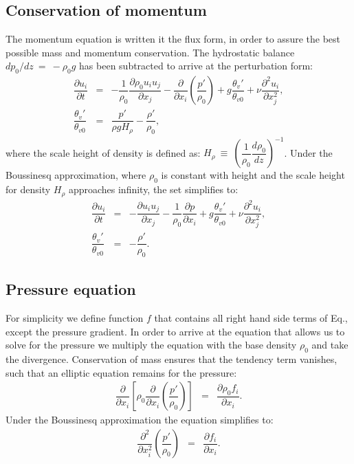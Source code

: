 \documentclass[gmd]{copernicus}
\begin{document}
\subsection{Conservation of momentum}
The momentum equation is written it the flux form, in order to assure the best possible mass and momentum conservation. The hydrostatic balance $dp_0 / dz~=~-\rho_0 g$ has been subtracted to arrive at the perturbation form:
\begin{eqnarray}
\dfrac{\partial u_i}{\partial t} & = & - \dfrac{1}{\rho_0} \dfrac{\partial \rho_0 u_i u_j}{\partial x_j} 
- \dfrac{\partial}{\partial x_i}\left(\dfrac{p'}{\rho_0}\right) + g \dfrac{\theta_v'}{\theta_{v0}} + \nu \dfrac{\partial^2 u_i}{\partial x_j^2}\label{eq:consmoma},\\
\dfrac{\theta_v'}{\theta_{v0}} & = & \dfrac{p'}{\rho g H_{\rho}} - \dfrac{\rho'}{\rho_0}\label{eq:statea},
\end{eqnarray}
where the scale height of density is defined as: $H_{\rho}~\equiv~\left( \dfrac{1}{\rho_0} \dfrac{d\rho_0}{dz} \right)^{-1}$. Under the Boussinesq approximation, where $\rho_0$ is constant with height and the scale height for density $H_\rho$ approaches infinity, the set simplifies to:
\begin{eqnarray}
\dfrac{\partial u_i}{\partial t} & = & - \dfrac{\partial u_i u_j}{\partial x_j}
- \dfrac{1}{\rho_0}\dfrac{\partial p}{\partial x_i} + g \dfrac{\theta_v'}{\theta_{v0}} + \nu \dfrac{\partial^2 u_i}{\partial x_j^2}\label{eq:consmomb},\\
\dfrac{\theta_v'}{\theta_{v0}} & = & - \dfrac{\rho'}{\rho_0}\label{eq:stateb}.
\end{eqnarray}

\subsection{Pressure equation}
For simplicity we define function $f$ that contains all right hand side terms of Eq., except the pressure gradient. In order to arrive at the equation that allows us to solve for the pressure we multiply the equation with the base density $\rho_0$ and take the divergence. Conservation of mass ensures that the tendency term vanishes, such that an elliptic equation remains for the pressure:
\begin{eqnarray}
\dfrac{\partial}{\partial x_i} 
\left[ \rho_0 \dfrac{\partial}{\partial x_i} \left( \dfrac{p'}{\rho_0} \right) \right] & = &
\dfrac{\partial \rho_0 f_i}{\partial x_i}.
\end{eqnarray}
Under the Boussinesq approximation the equation simplifies to:
\begin{eqnarray}
\label{eq:poisson}
\dfrac{\partial^2}{\partial x_i^2} \left( \dfrac{p'}{\rho_0} \right) & = &
\dfrac{\partial f_i}{\partial x_i}.
\end{eqnarray}
\end{document}
